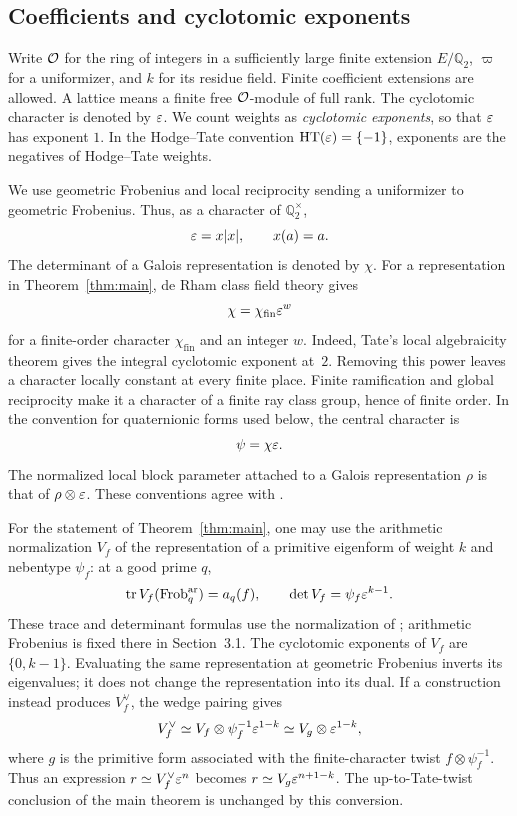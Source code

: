 \subsection{Coefficients and cyclotomic exponents}

Write \(\mathcal O\) for the ring of integers in a sufficiently large
finite extension \(E/\mathbb Q_2\), \(\varpi\) for a uniformizer,
and \(k\) for its residue field. Finite coefficient extensions
are allowed. A lattice means a finite free \(\mathcal O\)-module of
full rank. The cyclotomic character is denoted by \(\varepsilon\).
We count weights as \emph{cyclotomic exponents}, so that
\(\varepsilon\) has exponent \(1\). In the Hodge--Tate convention
\(\operatorname{HT}(\varepsilon)=\{-1\}\), exponents are the negatives of
Hodge--Tate weights.

We use geometric Frobenius and local reciprocity sending a
uniformizer to geometric Frobenius. Thus, as a character of
\(\mathbb Q_2^\times\),
\[
 \varepsilon=x|x|,\qquad x(a)=a.
\]
The determinant of a Galois representation is denoted by
\(\chi\). For a representation in Theorem~\ref{thm:main},
de Rham class field theory gives
\[
 \chi=\chi_{\mathrm{fin}}\varepsilon^w
\]
for a finite-order character \(\chi_{\mathrm{fin}}\) and an
integer \(w\). Indeed, Tate's local algebraicity theorem
\cite[Chapter~III, Section~1.2]{Serre1989Abelian} gives the integral
cyclotomic exponent at~\(2\). Removing this power leaves a character
locally constant at every finite place. Finite ramification and global
reciprocity make it a character of a finite ray class group, hence of
finite order.
In the convention for quaternionic forms
used below, the central character is
\[
 \psi=\chi\varepsilon.
\]
The normalized local block parameter attached to a Galois
representation \(\rho\) is that of \(\rho\otimes\varepsilon\).
These conventions agree with \cite[Sections~3.1--3.5]{Pan2022}.

For the statement of Theorem~\ref{thm:main}, one may use the arithmetic
normalization \(V_f\) of the representation of a primitive eigenform
of weight \(k\) and nebentype \(\psi_f\): at a good prime \(q\),
\[
 \operatorname{tr} V_f(\operatorname{Frob}^{\mathrm{ar}}_q)=a_q(f),\qquad
 \det V_f=\psi_f\varepsilon^{k-1}.
\]
These trace and determinant formulas use the normalization of
\cite[Theorem~6.1]{DeligneSerre1974}; arithmetic Frobenius is fixed
there in Section~3.1. The cyclotomic exponents of \(V_f\) are
\(\{0,k-1\}\). Evaluating the same
representation at geometric Frobenius inverts its eigenvalues; it
does not change the representation into its dual. If a construction
instead produces \(V_f^\vee\), the wedge pairing gives
\[
 V_f^\vee\simeq V_f\otimes\psi_f^{-1}\varepsilon^{1-k}
       \simeq V_g\otimes\varepsilon^{1-k},
\]
where \(g\) is the primitive form associated with the finite-character
twist \(f\otimes\psi_f^{-1}\). Thus an expression
\(r\simeq V_f^\vee\varepsilon^n\) becomes
\(r\simeq V_g\varepsilon^{n+1-k}\). The up-to-Tate-twist conclusion of the
main theorem is unchanged by this conversion.

